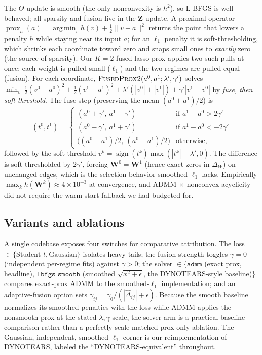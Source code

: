 \documentclass{article}
\newcommand{\W}{\bm{W}}
\newcommand{\Z}{\bm{Z}}
\newcommand{\Wd}{\Delta_{\!W}}
\newcommand{\sign}{\operatorname{sign}}
\DeclareMathOperator*{\argmin}{arg\,min}
\begin{document}
The $\Theta$-update is smooth (the only nonconvexity is $h^2$), so L-BFGS is
well-behaved; all sparsity and fusion live in the $\Z$-update. A proximal operator
$\operatorname{prox}_{h}(a)=\argmin_v h(v)+\tfrac12\|v-a\|^2$ returns the point that
lowers a penalty $h$ while staying near its input $a$; for an $\ell_1$ penalty it is
soft-thresholding, which shrinks each coordinate toward zero and snaps small ones to
\emph{exactly} zero (the source of sparsity). Our $K{=}2$ fused-lasso prox
\citep{tibshirani2005fused,friedman2007pathwise} applies two such pulls at once: each
weight is pulled small ($\ell_1$) and the two regimes are pulled equal (fusion). For
each coordinate, $\textsc{FusedProx2}(a^0,a^1;\lambda',\gamma')$ solves
$\min_{v}\ \tfrac12(v^0{-}a^0)^2+\tfrac12(v^1{-}a^1)^2+\lambda'(|v^0|{+}|v^1|)+\gamma'|v^1{-}v^0|$
by \emph{fuse, then soft-threshold}. The fuse step (preserving the mean $(a^0{+}a^1)/2$) is
\begin{equation}
(t^0,t^1)=
\begin{cases}
(a^0+\gamma',\ a^1-\gamma') & \text{if } a^1-a^0>2\gamma'\\
(a^0-\gamma',\ a^1+\gamma') & \text{if } a^1-a^0<-2\gamma'\\
\big((a^0{+}a^1)/2,\ (a^0{+}a^1)/2\big) & \text{otherwise,}
\end{cases}
\end{equation}
followed by the soft-threshold $v^k=\sign(t^k)\max(|t^k|-\lambda',0)$.
The difference is soft-thresholded by $2\gamma'$, forcing $\W^0=\W^1$ (hence exact
zeros in $\Wd$) on unchanged edges, which is the selection behavior smoothed-$\ell_1$ lacks.
Empirically $\max_k h(\W^k)\approx 4\times10^{-3}$ at convergence, and ADMM $\times$
nonconvex acyclicity did not require the warm-start fallback we had budgeted for.

\subsection{Variants and ablations}
A single codebase exposes four switches for comparative attribution. The
loss $\in\{\text{Student-}t,\text{Gaussian}\}$ isolates heavy tails; the fusion
strength toggles $\gamma{=}0$ (independent per-regime fits) against $\gamma{>}0$; the
solver $\in\{\texttt{admm}$ (exact prox, headline), $\texttt{lbfgs\_smooth}$ (smoothed
$\sqrt{x^2+\epsilon}$, the DYNOTEARS-style baseline)$\}$ compares exact-prox ADMM to
the smoothed-$\ell_1$ implementation; and an adaptive-fusion option sets
$\gamma_{ij}=\gamma_0/(|\hat\Delta_{ij}|+\epsilon)$. Because the smooth baseline
normalizes its smoothed penalties with the loss while ADMM applies the nonsmooth prox
at the stated $\lambda,\gamma$ scale, the solver arm is a practical baseline
comparison rather than a perfectly scale-matched prox-only ablation.
The Gaussian, independent, smoothed-$\ell_1$ corner is our reimplementation of
DYNOTEARS, labeled the ``DYNOTEARS-equivalent'' throughout.
\end{document}
